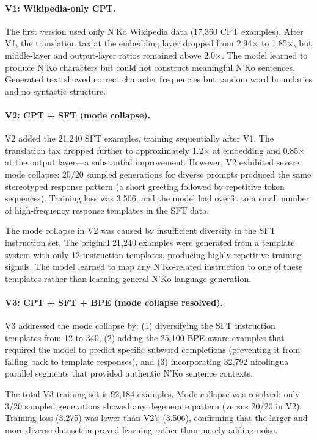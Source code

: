 \documentclass[11pt]{article}
\begin{document}
\paragraph{V1: Wikipedia-only CPT.}
The first version used only N'Ko Wikipedia data (17,360 CPT examples).
After V1, the translation tax at the embedding layer dropped from 2.94$\times$ to 1.85$\times$, but middle-layer and output-layer ratios remained above 2.0$\times$.
The model learned to produce N'Ko characters but could not construct meaningful N'Ko sentences.
Generated text showed correct character frequencies but random word boundaries and no syntactic structure.

\paragraph{V2: CPT + SFT (mode collapse).}
V2 added the 21,240 SFT examples, training sequentially after V1.
The translation tax dropped further to approximately 1.2$\times$ at embedding and 0.85$\times$ at the output layer---a substantial improvement.
However, V2 exhibited severe mode collapse: 20/20 sampled generations for diverse prompts produced the same stereotyped response pattern (a short greeting followed by repetitive token sequences).
Training loss was 3.506, and the model had overfit to a small number of high-frequency response templates in the SFT data.

The mode collapse in V2 was caused by insufficient diversity in the SFT instruction set.
The original 21,240 examples were generated from a template system with only 12 instruction templates, producing highly repetitive training signals.
The model learned to map any N'Ko-related instruction to one of these templates rather than learning general N'Ko language generation.

\paragraph{V3: CPT + SFT + BPE (mode collapse resolved).}
V3 addressed the mode collapse by: (1) diversifying the SFT instruction templates from 12 to 340, (2) adding the 25,100 BPE-aware examples that required the model to predict specific subword completions (preventing it from falling back to template responses), and (3) incorporating 32,792 nicolingua parallel segments that provided authentic N'Ko sentence contexts.

The total V3 training set is 92,184 examples.
Mode collapse was resolved: only 3/20 sampled generations showed any degenerate pattern (versus 20/20 in V2).
Training loss (3.275) was lower than V2's (3.506), confirming that the larger and more diverse dataset improved learning rather than merely adding noise.
\end{document}
